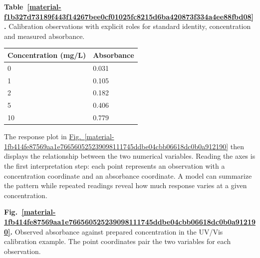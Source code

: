 \documentclass[11pt,a4paper]{article}
\newcounter{scripttable}
\begin{document}
\medskip

\par\medskip
{}
\label{material-f1b327d73189f443f14267bee0cf01025fc8215d6ba420873f334a4ee88fbd08}
\noindent\textbf{Table~\ref*{material-f1b327d73189f443f14267bee0cf01025fc8215d6ba420873f334a4ee88fbd08}.} Calibration observations with explicit roles for standard identity, concentration and measured absorbance.\par\nopagebreak
\begin{longtable}{@{}p{}p{}@{}}
Concentration (mg/L) & Absorbance \\ \hline
\endhead
0 & 0.031 \\ \hline
1 & 0.105 \\ \hline
2 & 0.182 \\ \hline
5 & 0.406 \\ \hline
10 & 0.779 \\ \hline
\end{longtable}
\medskip

The response plot in \hyperref[material-1fb414fe87569aa1e766560525239098111745ddbe04cbb06618dc0b0a912190]{Fig.~\ref*{material-1fb414fe87569aa1e766560525239098111745ddbe04cbb06618dc0b0a912190}} then displays the relationship between the two numerical variables. Reading the axes is the first interpretation step: each point represents an observation with a concentration coordinate and an absorbance coordinate. A model can summarize the pattern while repeated readings reveal how much response varies at a given concentration.


\par\medskip
\Needspace{10cm}
\label{material-1fb414fe87569aa1e766560525239098111745ddbe04cbb06618dc0b0a912190}
\noindent\textbf{Fig.~\ref*{material-1fb414fe87569aa1e766560525239098111745ddbe04cbb06618dc0b0a912190}.} Observed absorbance against prepared concentration in the UV/Vis calibration example. The point coordinates pair the two variables for each observation.\par\nopagebreak
\begin{center}
\end{center}
\end{document}
